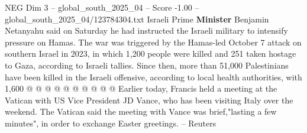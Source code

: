 \begin{textsample}{NEG Dim 3 – global\_south\_2025\_04 – Score -1.00 – global\_south\_2025\_04/123784304.txt}
Israeli Prime \textbf{Minister} Benjamin Netanyahu said on Saturday he had instructed the Israeli military to intensify pressure on Hamas.
The war was triggered by the Hamas-led October 7 attack on southern Israel in 2023, in which 1,200 people were killed and 251 taken hostage to Gaza, according to Israeli tallies.
Since then, more than 51,000 Palestinians have been killed in the Israeli offensive, according to local health authorities, with 1,600 @ @ @ @ @ @ @ @ @ @ Earlier today, Francis held a meeting at the Vatican with US Vice President JD Vance, who has been visiting Italy over the weekend.
The Vatican said the meeting with Vance was brief,"lasting a few minutes", in order to exchange Easter greetings. -- Reuters

\end{textsample}
